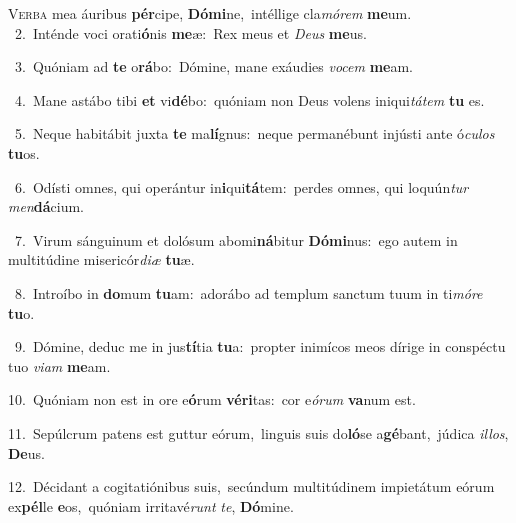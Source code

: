 \lettrine{\initial\textcolor{\initialcolor}{V}}{erba} mea áuribus \textbf{pér}\-cipe, \textbf{Dó}\-\textbf{mi}ne,~\star intéllige cla\-\textit{mó}\-\textit{rem} \textbf{me}\-um.\\
{\numbfont\textcolor{\numbcolor}{~2.}}~Inténde voci orati\-\textbf{ó}\-nis \textbf{me}\-æ:~\star Rex meus et \textit{De}\-\textit{us} \textbf{me}\-us.\par
{\numbfont\textcolor{\numbcolor}{~3.}}~Quóniam ad \textbf{te} o\-\textbf{rá}\-bo:~\star Dómine, mane exáudies \textit{vo}\-\textit{cem} \textbf{me}\-am.\par
{\numbfont\textcolor{\numbcolor}{~4.}}~Mane astábo tibi \textbf{et} vi\-\textbf{dé}\-bo:~\star quóniam non Deus volens iniqui\-\textit{tá}\-\textit{tem} \textbf{tu} es.\par
{\numbfont\textcolor{\numbcolor}{~5.}}~Neque habitábit juxta \textbf{te} ma\-\textbf{lí}\-gnus:~\star neque permanébunt injústi ante ó\-\textit{cu}\-\textit{los} \textbf{tu}\-os.\par
{\numbfont\textcolor{\numbcolor}{~6.}}~Odísti omnes, qui operántur in\-\textbf{i}\-qui\-\textbf{tá}\-tem:~\star perdes omnes, qui loquún\textit{tur} \textit{men}\-\textbf{dá}cium.\par
{\numbfont\textcolor{\numbcolor}{~7.}}~Virum sánguinum et dolósum abomi\-\textbf{ná}\-bitur \textbf{Dó}\-\textbf{mi}nus:~\star ego autem in multitúdine misericór\-\textit{di}\-\textit{æ} \textbf{tu}\-æ.\par
{\numbfont\textcolor{\numbcolor}{~8.}}~Introíbo in \textbf{do}\-mum \textbf{tu}\-am:~\star adorábo ad templum sanctum tuum in ti\-\textit{mó}\-\textit{re} \textbf{tu}\-o.\par
{\numbfont\textcolor{\numbcolor}{~9.}}~Dómine, deduc me in jus\-\textbf{tí}\-tia \textbf{tu}\-a:~\star propter inimícos meos dírige in conspéctu tuo \textit{vi}\-\textit{am} \textbf{me}\-am.\par
{\numbfont\textcolor{\numbcolor}{10.}}~Quóniam non est in ore e\-\textbf{ó}\-rum \textbf{vé}\-\textbf{ri}tas:~\star cor e\-\textit{ó}\-\textit{rum} \textbf{va}\-num est.\par
{\numbfont\textcolor{\numbcolor}{11.}}~Sepúlcrum patens est guttur eórum,~\dagger linguis suis do\-\textbf{ló}\-se a\-\textbf{gé}\-bant,~\star júdica \textit{il}\-\textit{los}, \textbf{De}\-us.\par
{\numbfont\textcolor{\numbcolor}{12.}}~Décidant a cogitatiónibus suis,~\dagger secúndum multitúdinem impietátum eórum ex\-\textbf{pél}\-le \textbf{e}\-os,~\star quóniam irritavé\textit{runt} \textit{te}\-, \textbf{Dó}\-mine.\par
